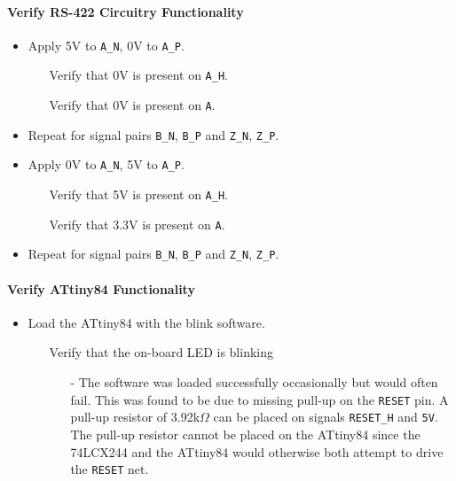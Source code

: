 \paragraph{Verify RS-422 Circuitry Functionality} %
\label{par:verify_rs_422_circuitry_functionality}
\begin{itemize}
	\item Apply 5V to \texttt{A\_N}, 0V to \texttt{A\_P}.
	\begin{itemize}
		\item[\cmark] Verify that 0V is present on \texttt{A\_H}.
		\item[\cmark] Verify that 0V is present on \texttt{A}.
	\end{itemize}
	\item Repeat for signal pairs \texttt{B\_N}, \texttt{B\_P} and \texttt{Z\_N}, \texttt{Z\_P}.
	\item Apply 0V to \texttt{A\_N}, 5V to \texttt{A\_P}.
	\begin{itemize}
		\item[\cmark] Verify that 5V is present on \texttt{A\_H}.
		\item[\cmark] Verify that 3.3V is present on \texttt{A}.
	\end{itemize}
	\item Repeat for signal pairs \texttt{B\_N}, \texttt{B\_P} and \texttt{Z\_N}, \texttt{Z\_P}.
\end{itemize}
\paragraph{Verify ATtiny84 Functionality} %
\label{par:verify_attiny84_functionality}
\begin{itemize}
	\item Load the ATtiny84 with the blink software.
	\begin{itemize}
		\item[\xmark] Verify that the on-board LED is blinking
		\begin{itemize}
			\item[-] The software was loaded successfully occasionally but would often fail.
			This was found to be due to missing pull-up on the \texttt{RESET} pin.
			A pull-up resistor of 3.92k$\Omega$ can be placed on signals \texttt{RESET\_H} and \texttt{5V}.
			The pull-up resistor cannot be placed on the ATtiny84 since the 74LCX244 and the ATtiny84 would otherwise both attempt to drive the \texttt{RESET} net.
		\end{itemize}
	\end{itemize}
\end{itemize}

